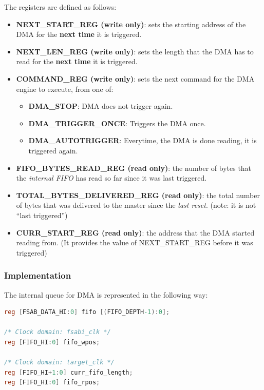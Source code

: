 \documentclass[10pt]{report}
\begin{document}
The registers are defined as follows:

\begin{itemize}
\item{\textbf{NEXT\_START\_REG (write only)}: sets the starting address of
the DMA for the \textbf{next time} it is triggered.}

\item{\textbf{NEXT\_LEN\_REG (write only)}: sets the length that the DMA has
to read for the \textbf{next time} it is triggered.}

\item{\textbf{COMMAND\_REG (write only)}: sets the next command for the DMA
engine to execute, from one of:}
\begin{itemize}
\item{\textbf{DMA\_STOP}: DMA does not trigger again.}
\item{\textbf{DMA\_TRIGGER\_ONCE}: Triggers the DMA once.}
\item{\textbf{DMA\_AUTOTRIGGER}: Everytime, the DMA is done reading, it is
triggered again.}
\end{itemize}

\item{\textbf{FIFO\_BYTES\_READ\_REG (read only)}: the number of bytes that
the \textit{internal FIFO} has read so far since it was last triggered.}

\item{\textbf{TOTAL\_BYTES\_DELIVERED\_REG (read only)}: the total number of
bytes that was delivered to the master since the \textit{last reset}. (note:
it is not ``last triggered'')}

\item{\textbf{CURR\_START\_REG (read only)}: the address that the DMA
started reading from. (It provides the value of NEXT\_START\_REG before it was
triggered)}

\end{itemize}

\subsubsection{Implementation}

The internal queue for DMA is represented in the following way:

\begin{lstlisting}[basicstyle=\footnotesize,language=Verilog]
reg [FSAB_DATA_HI:0] fifo [(FIFO_DEPTH-1):0];
 
/* Clock domain: fsabi_clk */
reg [FIFO_HI:0] fifo_wpos;
 
/* Clock domain: target_clk */
reg [FIFO_HI+1:0] curr_fifo_length;
reg [FIFO_HI:0] fifo_rpos;
\end{lstlisting}
\end{document}
